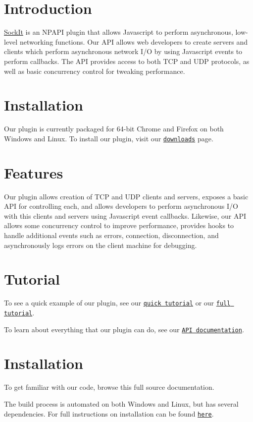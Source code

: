 \hypertarget{index_intro_sec}{}\section{Introduction}\label{index_intro_sec}
\hyperlink{classSockIt}{SockIt} is an NPAPI plugin that allows Javascript to perform asynchronous, low-\/level networking functions. Our API allows web developers to create servers and clients which perform asynchronous network I/O by using Javascript events to perform callbacks. The API provides access to both TCP and UDP protocols, as well as basic concurrency control for tweaking performance.\hypertarget{index_install_sec}{}\section{Installation}\label{index_install_sec}
Our plugin is currently packaged for 64-\/bit Chrome and Firefox on both Windows and Linux. To install our plugin, visit our \href{http://sockit.github.com/downloads.html}{\tt downloads} page.\hypertarget{index_features_sec}{}\section{Features}\label{index_features_sec}
Our plugin allows creation of TCP and UDP clients and servers, exposes a basic API for controlling each, and allows developers to perform asynchronous I/O with this clients and servers using Javascript event callbacks. Likewise, our API allows some concurrency control to improve performance, provides hooks to handle additional events such as errors, connection, disconnection, and asynchronously logs errors on the client machine for debugging.\hypertarget{index_tutorial_sec}{}\section{Tutorial}\label{index_tutorial_sec}
To see a quick example of our plugin, see our \href{http://sockit.github.com/tutorial.html}{\tt quick tutorial} or our \href{http://sockit.github.com/tutorial/full_tutorial.html}{\tt full tutorial}. 

To learn about everything that our plugin can do, see our \href{http://sockit.github.com/api_documentation.html}{\tt API documentation}.\hypertarget{index_install_sec}{}\section{Installation}\label{index_install_sec}
To get familiar with our code, browse this full source documentation. 

The build process is automated on both Windows and Linux, but has several dependencies. For full instructions on installation can be found \href{../index.html}{\tt here}.  